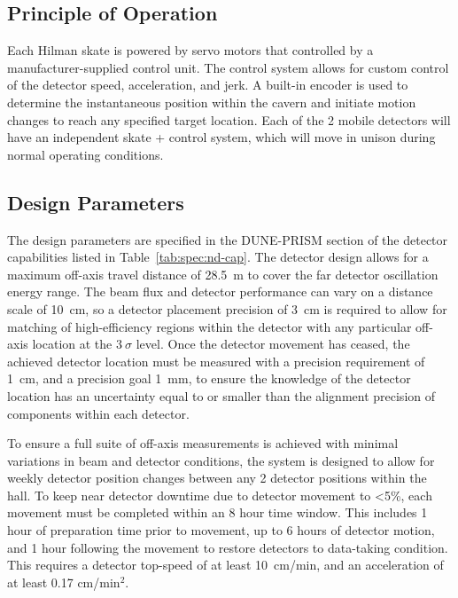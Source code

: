 \subsection{Principle of Operation}
\label{sec:prism-ovvw-op}

Each Hilman skate is powered by servo motors that controlled by a manufacturer-supplied control unit. The control system allows for custom control of the detector speed, acceleration, and jerk. A built-in encoder is used to determine the instantaneous position within the cavern and initiate motion changes to reach any specified target location. Each of the 2 mobile detectors will have an independent skate + control system, which will move in unison during normal operating conditions.

\subsection{Design Parameters}
\label{sec:prism-ovvw-param}

The design parameters are specified in the DUNE-PRISM section of the detector capabilities listed in Table~\ref{tab:spec:nd-cap}. The detector design allows for a maximum off-axis travel distance of 28.5~m to cover the far detector oscillation energy range. The beam flux and detector performance can vary on a distance scale of 10~cm, so a detector placement precision of 3~cm is required to allow for matching of high-efficiency regions within the detector with any particular off-axis location at the $3~\sigma$ level. Once the detector movement has ceased, the achieved detector location must be measured with a precision requirement of 1~cm, and a precision goal 1~mm, to ensure the knowledge of the detector location has an uncertainty equal to or smaller than the alignment precision of components within each detector.

To ensure a full suite of off-axis measurements is achieved with minimal variations in beam and detector conditions, the system is designed to allow for weekly detector position changes between any 2 detector positions within the hall. To keep near detector downtime due to detector movement to <5\%, each movement must be completed within an 8 hour time window. This includes 1 hour of preparation time prior to movement, up to 6 hours of detector motion, and 1 hour following the movement to restore detectors to data-taking condition. This requires a detector top-speed of at least 10~cm/min, and an acceleration of at least 0.17 cm/min$^2$.



